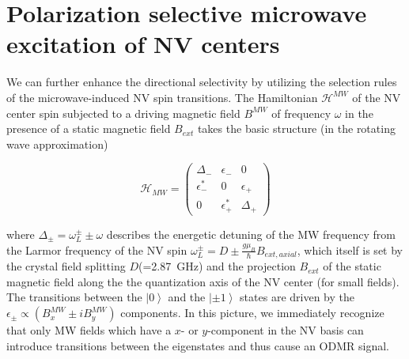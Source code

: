 \documentclass[
 reprint,
 amsmath,
 amssymb,
aps,
 prb,
showpacs
]{revtex4-1}
\newcommand{\ket}[1]{\left \vert #1 \right \rangle}
\begin{document}




\section{Polarization selective microwave excitation of NV centers}

We can further enhance the directional selectivity by utilizing the selection rules of the microwave-induced NV spin transitions. The Hamiltonian $\mathcal{H}^{MW}$ of the NV center spin subjected to a driving magnetic field $B^{MW}$ of frequency $\omega$ in the presence of a static magnetic field $B_{ext}$ takes the basic structure (in the rotating wave approximation)~\cite{PhysRevA.90.012302}

\begin{equation}
\mathcal{H}_{MW} = \begin{pmatrix} \Delta_- & \epsilon_- & 0\\ \epsilon_-^* & 0 & \epsilon_+ \\ 0 & \epsilon_+^* & \Delta_+ \end{pmatrix}
\label{eq:MWHam}
\end{equation}

where $\Delta_{\pm}=\omega^{\pm}_L{\pm}\omega$ describes the energetic detuning of the MW frequency from the Larmor frequency of the NV spin $\omega_L^{\pm}=D \pm \frac{g \mu_B}{\hbar} B_{ext,axial}$, which itself is set by the crystal field splitting $D$(=2.87~GHz) and the projection $B_{ext}$ of the static magnetic field along the the quantization axis of the NV center (for small fields). The transitions between the $\ket{0}$ and the $\ket{\pm 1}$ states are driven by the $ \epsilon_{\pm} \propto (B^{MW}_x \pm i B^{MW}_y )$ components. In this picture, we immediately recognize that only MW fields which have a $x$- or $y$-component in the NV basis can introduce transitions between the eigenstates and thus cause an ODMR signal.
\end{document}
